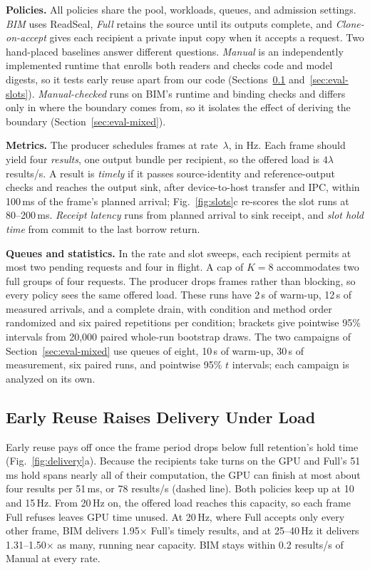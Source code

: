 \documentclass[conference]{IEEEtran}
\newcommand{\ms}{\,ms}
\newcommand{\Hz}{\,Hz}
\begin{document}
\textbf{Policies.} All policies share the pool, workloads, queues, and admission settings. \emph{BIM} uses ReadSeal, \emph{Full} retains the source until its outputs complete, and \emph{Clone-on-accept} gives each recipient a private input copy when it accepts a request. Two hand-placed baselines answer different questions. \emph{Manual} is an independently implemented runtime that enrolls both readers and checks code and model digests, so it tests early reuse apart from our code (Sections~\ref{sec:eval-delivery} and~\ref{sec:eval-slots}). \emph{Manual-checked} runs on BIM's runtime and binding checks and differs only in where the boundary comes from, so it isolates the effect of deriving the boundary (Section~\ref{sec:eval-mixed}).

\textbf{Metrics.} The producer schedules frames at rate~$\lambda$, in Hz. Each frame should yield four \emph{results}, one output bundle per recipient, so the offered load is $4\lambda$ results/s. A result is \emph{timely} if it passes source-identity and reference-output checks and reaches the output sink, after device-to-host transfer and IPC, within 100\ms{} of the frame's planned arrival; Fig.~\ref{fig:slots}c re-scores the slot runs at 80--200\ms. \emph{Receipt latency} runs from planned arrival to sink receipt, and \emph{slot hold time} from commit to the last borrow return.

\textbf{Queues and statistics.} In the rate and slot sweeps, each recipient permits at most two pending requests and four in flight. A cap of $K{=}8$ accommodates two full groups of four requests. The producer drops frames rather than blocking, so every policy sees the same offered load. These runs have 2\,s of warm-up, 12\,s of measured arrivals, and a complete drain, with condition and method order randomized and six paired repetitions per condition; brackets give pointwise 95\% intervals from 20,000 paired whole-run bootstrap draws. The two campaigns of Section~\ref{sec:eval-mixed} use queues of eight, 10\,s of warm-up, 30\,s of measurement, six paired runs, and pointwise 95\% $t$ intervals; each campaign is analyzed on its own.

\subsection{Early Reuse Raises Delivery Under Load}
\label{sec:eval-delivery}

Early reuse pays off once the frame period drops below full retention's hold time (Fig.~\ref{fig:delivery}a). Because the recipients take turns on the GPU and Full's 51\ms{} hold spans nearly all of their computation, the GPU can finish at most about four results per 51\ms, or 78 results/s (dashed line). Both policies keep up at 10 and 15\Hz. From 20\Hz{} on, the offered load reaches this capacity, so each frame Full refuses leaves GPU time unused. At 20\Hz, where Full accepts only every other frame, BIM delivers 1.95$\times$ Full's timely results, and at 25--40\Hz{} it delivers 1.31--1.50$\times$ as many, running near capacity. BIM stays within 0.2 results/s of Manual at every rate.
\end{document}

